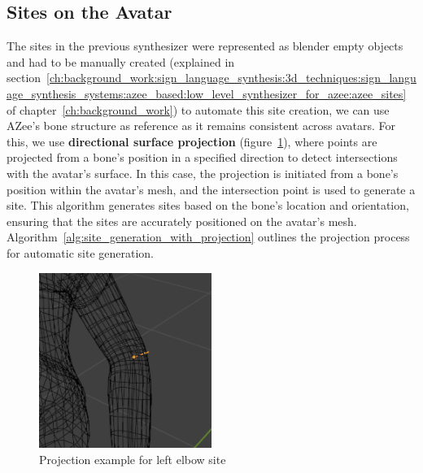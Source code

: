 \documentclass[../../main.tex]{subfiles}
\begin{document}
\subsection{Sites on the Avatar}
\label{ch:avatar_creation_pose_synthesis:proc_rig_signing_avatars:auto_site_generation}

The sites in the previous synthesizer were represented as blender empty objects and had to be manually created (explained in section~\ref{ch:background_work:sign_language_synthesis:3d_techniques:sign_language_synthesis_systems:azee_based:low_level_synthesizer_for_azee:azee_sites} of chapter~\ref{ch:background_work}) to automate this site creation, we can use AZee's bone structure as reference as it remains consistent across avatars. For this, we use \textbf{directional surface projection} (figure~\ref{fig:site_surface_projection}), where points are projected from a bone's position in a specified direction to detect intersections with the avatar's surface. In this case, the projection is initiated from a bone's position within the avatar's mesh, and the intersection point is used to generate a site. This algorithm generates sites based on the bone's location and orientation, ensuring that the sites are accurately positioned on the avatar's mesh. Algorithm~\ref{alg:site_generation_with_projection} outlines the projection process for automatic site generation.

\begin{figure}[ht]
    \centering
    \includegraphics[width=0.5\textwidth]{chapters/avatar_creation_pose_synthesis/images/site_surface_projection.png}
    \caption{Projection example for left elbow site}
    \label{fig:site_surface_projection}
\end{figure}
\end{document}
